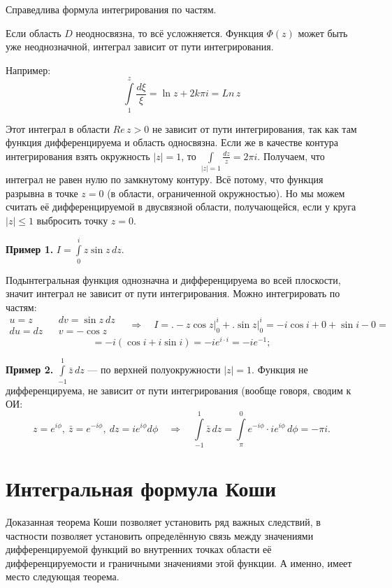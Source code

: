 \documentclass[a4paper, 12pt]{report}
\begin{document}
Справедлива формула интегрирования по частям.

Если область $D$ неодносвязна, то всё усложняется. Функция $\Phi(z)$ может быть уже неоднозначной, интеграл зависит от пути интегрирования.

Например:
$$\int\limits_1^z\frac{d\xi}{\xi} = \ln z + 2k\pi i = Ln\,z$$

Этот интеграл в области $Re\,z > 0$ не зависит от пути интегрирования, так как там функция дифференцируема и область односвязна. Если же в качестве контура интегрирования взять окружность $|z| = 1$, то $\int\limits_{|z|=1}\frac{dz}{z} = 2\pi i$. Получаем, что интеграл не равен нулю по замкнутому контуру. Всё потому, что функция разрывна в точке $z = 0$ (в области, ограниченной окружностью). Но мы можем считать её дифференцируемой в двусвязной области, получающейся, если у круга $|z| \leqslant 1$ выбросить точку $z = 0$.
\par\bigskip

\textbf{Пример 1.} \quad
$I = \int\limits_0^i z\sin z\,dz$.

Подынтегральная функция однозначна и дифференцируема во всей плоскости, значит интеграл не зависит от пути интегрирования. Можно интегрировать по частям:
\[\begin{matrix} 
u = z && dv = \sin z\:dz \\ du = dz && v = -\cos z
\end{matrix} \quad \Rightarrow \quad 
I = \bigl. -z\cos z \bigr|_0^i + \bigl. \sin z \bigr|_0^i = -i\cos i + 0 + \sin i - 0 = \]
\[= -i(\cos i + i\sin i) = -ie^{i\cdot i} = -ie^{-1};\]
\par\bigskip

\textbf{Пример 2.} \quad
$\int\limits_{-1}^1 \bar z\,dz$ --- по верхней полуокружности $|z| = 1$. Функция не дифференцируема, не зависит от пути интегрирования (вообще говоря, сводим к ОИ:
$$z = e^{i\phi},\ \bar z = e^{-i\phi},\ dz = ie^{i\phi}d\phi \quad \Rightarrow \quad
\int\limits_{-1}^1 \bar z\,dz = \int\limits_\pi^0 e^{-i\phi}\cdot ie^{i\phi}\,d\phi = -\pi i.$$










\section{Интегральная формула Коши}

Доказанная теорема Коши позволяет установить ряд важных следствий, в частности позволяет установить определённую связь между значениями дифференцируемой функций во внутренних точках области её дифференцируемости и граничными значениями этой функции. А именно, имеет место следующая теорема.
\end{document}
